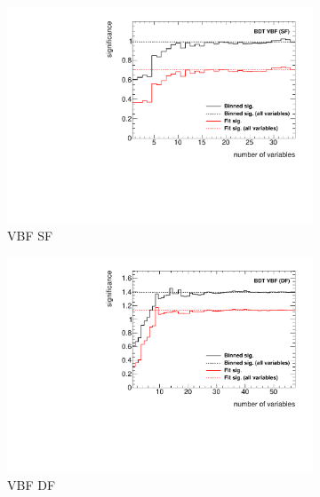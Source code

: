 \begin{figure}[htb]
    \centering
    \begin{subfigure}[t]{0.49\textwidth}
        \includegraphics[width=\textwidth]{./plots/mva/variable_reduction/VBF_SF_sig_vs_nvars_all.pdf}
        \caption{VBF SF}
    \end{subfigure}
    \begin{subfigure}[t]{0.49\textwidth}
        \includegraphics[width=\textwidth]{./plots/mva/variable_reduction/VBF_DF_sig_vs_nvars_all.pdf}
        \caption{VBF DF}
    \end{subfigure}
    \begin{subfigure}[t]{0.49\textwidth}

\end{subfigure}
\end{figure}
